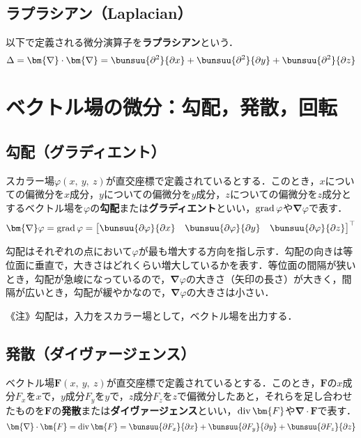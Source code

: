 \subsection{ラプラシアン（Laplacian）}

以下で定義される微分演算子を\textbf{ラプラシアン}という．
\begin{equation}
	\Delta = \bm{\nabla} \cdot \bm{\nabla} = \bunsuu{\partial^2}{\partial x} + \bunsuu{\partial^2}{\partial y} + \bunsuu{\partial^2}{\partial z}
\end{equation}



\section{ベクトル場の微分：勾配，発散，回転}
\subsection{勾配（グラディエント）}

スカラー場$\varphi(x,\ y,\ z)$が直交座標で定義されているとする．このとき，$x$についての偏微分を$x$成分，$y$についての偏微分を$y$成分，$z$についての偏微分を$z$成分とするベクトル場を$\varphi$の\textbf{勾配}または\textbf{グラディエント}といい，$\operatorname{grad} \varphi$や$\bm{\nabla} \varphi$で表す．
\begin{equation}
	\bm{\nabla} \varphi = \grad \varphi =
	\begin{bmatrix}
		\bunsuu{\partial \varphi}{\partial x} &
		\bunsuu{\partial \varphi}{\partial y} &
		\bunsuu{\partial \varphi}{\partial z}
	\end{bmatrix}^\top
\end{equation}

勾配はそれぞれの点において$\varphi$が最も増大する方向を指し示す．勾配の向きは等位面に垂直で，大きさはどれくらい増大しているかを表す．等位面の間隔が狭いとき，勾配が急峻になっているので，$\bm{\nabla} \varphi$の大きさ（矢印の長さ）が大きく，間隔が広いとき，勾配が緩やかなので，$\bm{\nabla} \varphi$の大きさは小さい．

《注》勾配は，入力をスカラー場として，ベクトル場を出力する．



\subsection{発散（ダイヴァージェンス）}

ベクトル場$\bm{F}(x,\ y,\ z)$が直交座標で定義されているとする．このとき，$\bm{F}$の$x$成分$F_x$を$x$で，$y$成分$F_y$を$y$で，$z$成分$F_z$を$z$で偏微分したあと，それらを足し合わせたものを$\bm{F}$の\textbf{発散}または\textbf{ダイヴァージェンス}といい，$\dive \bm{F}$や$\bm{\nabla} \cdot \bm{F}$で表す．
\begin{equation}
	\bm{\nabla} \cdot \bm{F} = \dive \bm{F} = \bunsuu{\partial F_x}{\partial x} + \bunsuu{\partial F_y}{\partial y} + \bunsuu{\partial F_z}{\partial z}
\end{equation}

